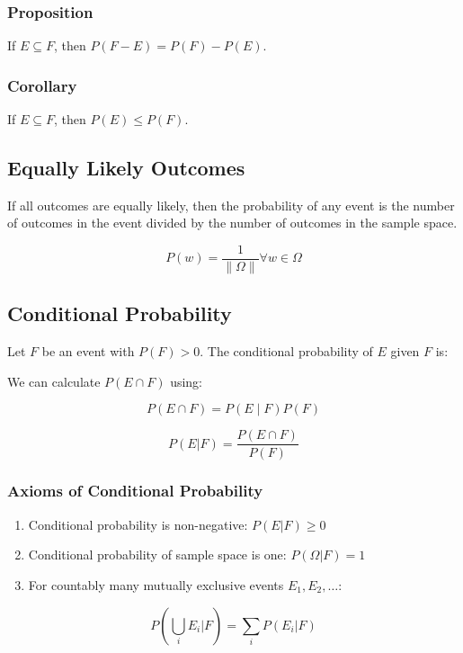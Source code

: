 \subsubsection*{Proposition}

If $E \subseteq F$, then $P(F-E) = P(F) - P(E)$.

\subsubsection*{Corollary}

If $E \subseteq F$, then $P(E) \leq P(F)$.

\subsection*{Equally Likely Outcomes}

If all outcomes are equally likely, then the probability of any event is the number of outcomes in the event divided by the number of outcomes in the sample space.

$$ P(w) = \frac{1}{\|\Omega\|} \forall w \in \Omega $$

\subsection*{Conditional Probability}

Let $F$ be an event with $P(F) > 0$. The conditional probability of $E$ given $F$ is:

We can calculate $P(E \cap F)$ using:

$$ P(E \cap F) = P(E \mid F)P(F) $$

$$ P(E|F) = \frac{P(E \cap F)}{P(F)} $$

\subsubsection*{Axioms of Conditional Probability}

\begin{enumerate}
      \item Conditional probability is non-negative: $P(E|F) \geq 0$
      \item Conditional probability of sample space is one: $P(\Omega|F) = 1$
      \item For countably many mutually exclusive events $E_1, E_2, \dots$:
\end{enumerate}

$$ P\left(\bigcup_{i} E_i|F\right) = \sum_{i} P(E_i|F) $$

